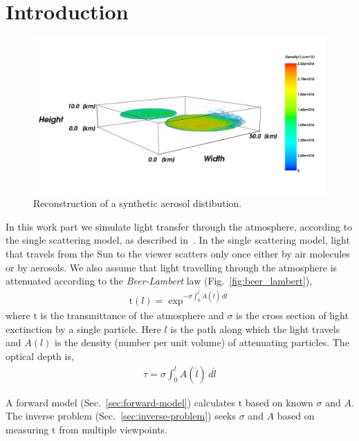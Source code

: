 \documentclass[10pt,twocolumn,letterpaper]{article}
\newcommand{\derivsym}[1]{\,d{#1}}
\begin{document}
\section{Introduction}


\begin{figure}
  \centering 
    \includegraphics[width=\columnwidth]{images/front.png}
    \caption{Reconstruction of a synthetic aerosol distibution.}
  \label{fig:front}
\end{figure}
In this work part we simulate light transfer through the atmosphere,
according to the single scattering model, as described
in~\cite{Levi1980}. In the single scattering model, light that travels
from the Sun to the viewer scatters only once either by air molecules
or by aerosols. We also assume that light travelling through the
atmosphere is attenuated according to the {\em Beer-Lambert} law
(Fig.~\ref{fig:beer_lambert}),
\begin{align}
  \mathrm{t}(l)=\exp^{-\sigma \int_{0}^l
    A(\acute{l})\derivsym{\acute{l}}}
  \label{eq:beer-lambert}
\end{align}
where $\mathrm{t}$ is the transmittance of the atmosphere and $\sigma$
is the cross section of light exctinction by a single particle. Here
$l$ is the path along which the light travels and $A(l)$ is the
density (number per unit volume) of attenuating particles. The optical
depth is,
\begin{align}
  \tau = \sigma \int_{0}^l A(\acute{l})\derivsym{\acute{l}}
  \label{eq:tau_definition}
\end{align}

A forward model (Sec.~\ref{sec:forward-model}) calculates $\mathrm{t}$
based on known $\sigma$ and $A$. The inverse problem
(Sec.~\ref{sec:inverse-problem}) seeks $\sigma$ and $A$ based on
measuring $\mathrm{t}$ from multiple viewpoints.
\end{document}
